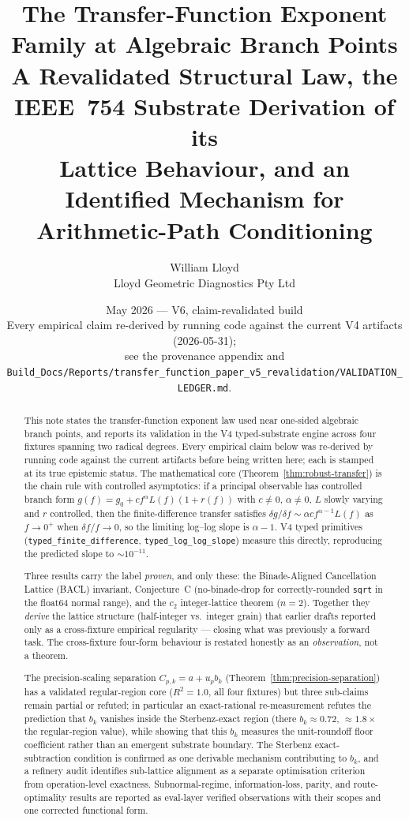 \documentclass[11pt,a4paper]{article}
\title{The Transfer-Function Exponent Family at Algebraic Branch Points\\
\large A Revalidated Structural Law, the IEEE~754 Substrate Derivation of its\\
Lattice Behaviour, and an Identified Mechanism for Arithmetic-Path Conditioning}
\author{William Lloyd\\\small Lloyd Geometric Diagnostics Pty Ltd}
\date{May 2026 --- V6, claim-revalidated build\\
\small Every empirical claim re-derived by running code against the current V4 artifacts (2026-05-31);\\
\small see the provenance appendix and \texttt{Build\_Docs/Reports/transfer\_function\_paper\_v5\_revalidation/VALIDATION\_LEDGER.md}.}
\begin{document}
\maketitle

\begin{abstract}
\noindent
This note states the transfer-function exponent law used near one-sided algebraic branch points, and reports its validation in the V4 typed-substrate engine across four fixtures spanning two radical degrees. Every empirical claim below was re-derived by running code against the current artifacts before being written here; each is stamped at its true epistemic status. The mathematical core (Theorem~\ref{thm:robust-transfer}) is the chain rule with controlled asymptotics: if a principal observable has controlled branch form $g(f)=g_0+c f^{\alpha}L(f)(1+r(f))$ with $c\ne0$, $\alpha\ne0$, $L$ slowly varying and $r$ controlled, then the finite-difference transfer satisfies $\delta g/\delta f\sim\alpha c f^{\alpha-1}L(f)$ as $f\to0^+$ when $\delta f/f\to0$, so the limiting log--log slope is $\alpha-1$. V4 typed primitives (\texttt{typed\_finite\_difference}, \texttt{typed\_log\_log\_slope}) measure this directly, reproducing the predicted slope to $\sim10^{-11}$.

Three results carry the label \emph{proven}, and only these: the Binade-Aligned Cancellation Lattice (BACL) invariant, Conjecture~C (no-binade-drop for correctly-rounded \texttt{sqrt} in the float64 normal range), and the $c_2$ integer-lattice theorem ($n{=}2$). Together they \emph{derive} the lattice structure (half-integer vs.\ integer grain) that earlier drafts reported only as a cross-fixture empirical regularity --- closing what was previously a forward task. The cross-fixture four-form behaviour is restated honestly as an \emph{observation}, not a theorem.

The precision-scaling separation $C_{p,k}=a+u_p b_k$ (Theorem~\ref{thm:precision-separation}) has a validated regular-region core ($R^2=1.0$, all four fixtures) but three sub-claims remain partial or refuted; in particular an exact-rational re-measurement refutes the prediction that $b_k$ vanishes inside the Sterbenz-exact region (there $b_k\approx0.72$, $\approx1.8\times$ the regular-region value), while showing that this $b_k$ measures the unit-roundoff floor coefficient rather than an emergent substrate boundary. The Sterbenz exact-subtraction condition is confirmed as one derivable mechanism contributing to $b_k$, and a refinery audit identifies sub-lattice alignment as a separate optimisation criterion from operation-level exactness. Subnormal-regime, information-loss, parity, and route-optimality results are reported as eval-layer verified observations with their scopes and one corrected functional form.
\end{abstract}
\end{document}
